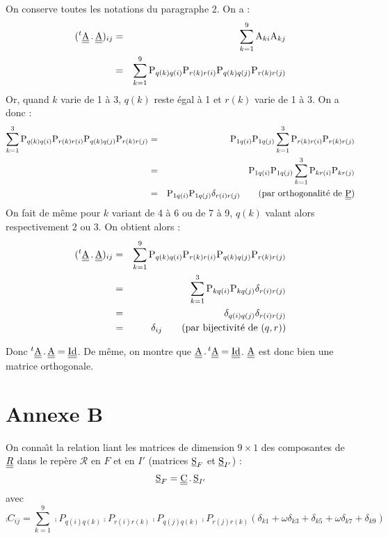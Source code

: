 On conserve toutes les notations du paragraphe 2. On a :
\begin{eqnarray}
(^t\underline{\underline{\textrm{A}}}\,.\,\underline{\underline{\textrm{A}}})_{ij}
& = & \sum_{k=1}^9\textrm{A}_{ki}\textrm{A}_{kj}\nonumber\\
& = & \sum_{k=1}^9
\textrm{P}_{q(k)q(i)}\textrm{P}_{r(k)r(i)}\textrm{P}_{q(k)q(j)}\textrm{P}_{r(k)r(j)}
\end{eqnarray}
Or, quand $k$ varie de 1 \`a 3, $q(k)$ reste \'egal \`a 1 et $r(k)$ varie de 1
\`a 3. On a donc :
\begin{eqnarray}
\sum_{k=1}^3
\textrm{P}_{q(k)q(i)}\textrm{P}_{r(k)r(i)}\textrm{P}_{q(k)q(j)}\textrm{P}_{r(k)r(j)}
&=&\textrm{P}_{1q(i)}\textrm{P}_{1q(j)}\sum_{k=1}^3
\textrm{P}_{r(k)r(i)}\textrm{P}_{r(k)r(j)}\nonumber\\
&=&\textrm{P}_{1q(i)}\textrm{P}_{1q(j)}\sum_{k=1}^3
\textrm{P}_{kr(i)}\textrm{P}_{kr(j)}\\
&=&\textrm{P}_{1q(i)}\textrm{P}_{1q(j)}\delta_{r(i)r(j)}\qquad\text{(par
orthogonalit\'e de $\underline{\underline{\textrm{P}}}$)}\nonumber
\end{eqnarray}
On fait de m\^eme pour $k$ variant de 4 \`a 6 ou de 7 \`a 9, $q(k)$ valant alors 
respectivement 2 ou 3. On obtient alors :
\begin{eqnarray}
(^t\underline{\underline{\textrm{A}}}\,.\,\underline{\underline{\textrm{A}}})_{ij}
&=&
\sum_{k=1}^9
\textrm{P}_{q(k)q(i)}\textrm{P}_{r(k)r(i)}\textrm{P}_{q(k)q(j)}\textrm{P}_{r(k)r(j)}
\nonumber\\
&=&
\sum_{k=1}^3\textrm{P}_{kq(i)}\textrm{P}_{kq(j)}\delta_{r(i)r(j)}\\
&=&\delta_{q(i)q(j)}\delta_{r(i)r(j)}\nonumber\\
&=&\delta_{ij}\qquad
\text{(par bijectivit\'e de $(q,r)$)}\nonumber
\end{eqnarray}

Donc $^t\underline{\underline{\textrm{A}}}\,.\,\underline{\underline{\textrm{A}}}=\underline{\underline{\textrm{Id}}}$. De m\^eme, on montre que
$\underline{\underline{\textrm{A}}}\,.\,^t\underline{\underline{\textrm{A}}}=\underline{\underline{\textrm{Id}}}$. $\underline{\underline{\textrm{A}}}$ est donc bien une matrice
orthogonale.


\section{Annexe B}

On conna\^\i t la relation liant les matrices de dimension $9\times1$ 
des composantes de $\underline{\underline{R}}$ dans le rep\`ere $\mathcal{R}$ en $F$ et en $I'$ 
(matrices $\underline{\textrm{S}}_F$ et $\underline{\textrm{S}}_{I'}$) :
\begin{equation}
\underline{\textrm{S}}_F=\underline{\underline{\textrm{C}}}\,.\,\underline{\textrm{S}}_{I'}
\end{equation}
avec
\begin{equation}
\comp{C}_{ij}=\sum_{k=1}^9
\comp{P}_{q(i)q(k)}\comp{P}_{r(i)r(k)}\comp{P}_{q(j)q(k)}\comp{P}_{r(j)r(k)}
(\delta_{k1}+\omega\delta_{k3}+\delta_{k5}+\omega\delta_{k7}+\delta_{k9})
\end{equation}

